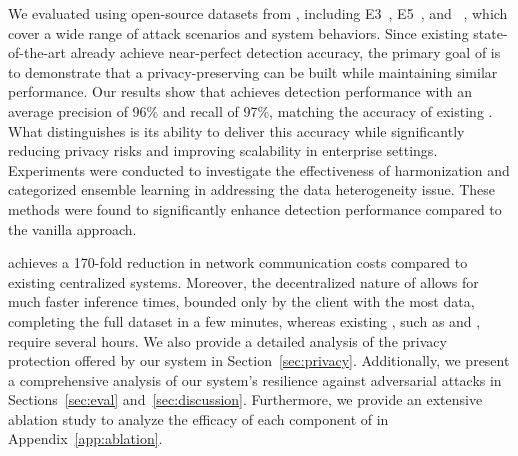 We evaluated \Sys using open-source datasets from \darpa, including E3~\cite{error3}, E5~\cite{bug5}, and \optc~\cite{anjum2021analyzing}, which cover a wide range of attack scenarios and system behaviors. Since existing state-of-the-art \pids already achieve near-perfect detection accuracy, the primary goal of \Sys is to demonstrate that a privacy-preserving \pids can be built while maintaining similar performance. Our results show that \Sys achieves detection performance with an average precision of 96\% and recall of 97\%, matching the accuracy of existing \pids. What distinguishes \Sys is its ability to deliver this accuracy while significantly reducing privacy risks and improving scalability in enterprise settings. Experiments were conducted to investigate the effectiveness of \wordvec harmonization and categorized ensemble learning in addressing the data heterogeneity issue. These methods were found to significantly enhance detection performance compared to the vanilla approach.


\Sys achieves a 170-fold reduction in network communication costs compared to existing centralized systems. Moreover, the decentralized nature of \Sys allows for much faster inference times, bounded only by the client with the most data, completing the full \optc dataset in a few minutes, whereas existing \pids, such as \flash and \kairos, require several hours. We also provide a detailed analysis of the privacy protection offered by our system in Section~\ref{sec:privacy}. Additionally, we present a comprehensive analysis of our system's resilience against adversarial attacks in Sections~\ref{sec:eval} and~\ref{sec:discussion}. Furthermore, we provide an extensive ablation study to analyze the efficacy of each component of \Sys in Appendix~\ref{app:ablation}.



